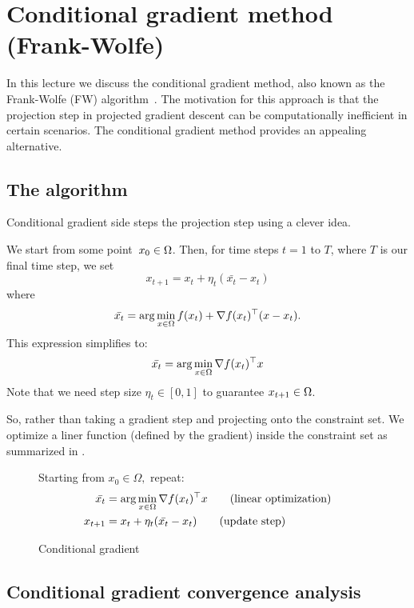\section{Conditional gradient method (Frank-Wolfe)}

In this lecture we discuss the conditional gradient method, also known as the
Frank-Wolfe (FW) algorithm~\cite{Frank1956}. The motivation for this approach is
that the projection step in projected gradient descent can be computationally
inefficient in certain scenarios. The conditional gradient method provides an
appealing alternative.

\subsection{The algorithm}
Conditional gradient side steps the projection step using a clever idea.

We start from some point~$x_0\in\Omega$. Then, for time steps $t = 1$ to $T$, 
where $T$ is our final time step, we set
\[
x_{t+1} = x_t + \eta_t(\bar{x_t}-x_t)
\]
where
$$ \bar{x_t} = \arg\min_{x\in \Omega} f(x_t) + \nabla f(x_t) ^\top (x-x_t).$$
This expression simplifies to:
$$ \bar{x_t} = \arg\min_{x\in \Omega} \nabla f(x_t) ^\top x $$
Note that we need step size $\eta_t \in [0,1]$ to guarantee $x_{t+1} \in \Omega$.

So, rather than taking a gradient step and projecting onto the constraint set.
We optimize a liner function (defined by the gradient) inside the constraint
set as summarized in .

\begin{figure}[h]
\begin{center}
\begin{boxedminipage}{0.85\textwidth}
Starting from $x_0\in\Omega,$ repeat:
\begin{align*}
\bar{x_t} &= \arg\min_{x\in \Omega} \nabla f(x_t) ^\top x \tag{linear optimization}\\
x_{t+1} &= x_t + \eta_t(\bar{x_t}-x_t) \tag{update step}\\
\end{align*}
\end{boxedminipage}
\end{center}
\caption{Conditional gradient}
\end{figure}


\subsection{Conditional gradient convergence analysis}

